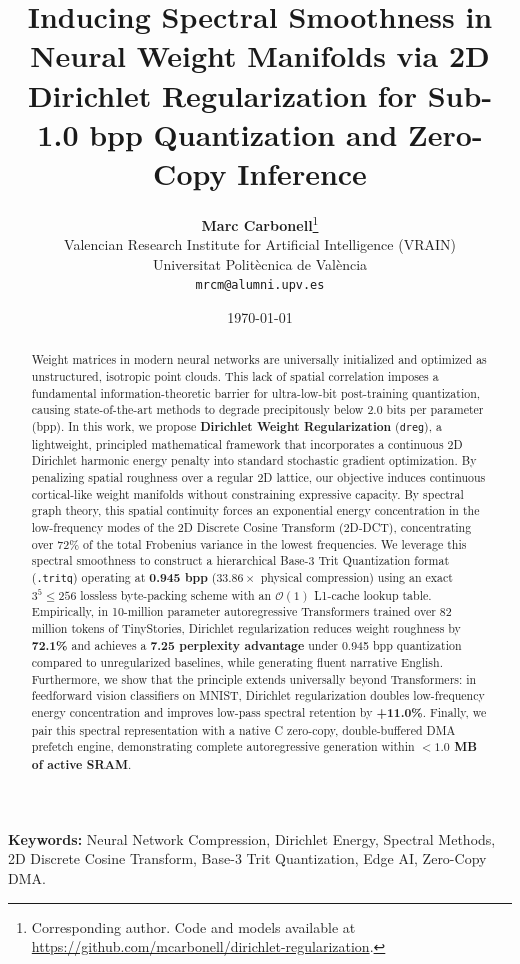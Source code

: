 \documentclass[11pt,a4paper]{article}
\title{\textbf{Inducing Spectral Smoothness in Neural Weight Manifolds via 2D Dirichlet Regularization for Sub-1.0 bpp Quantization and Zero-Copy Inference}}
\author{
  \textbf{Marc Carbonell}\thanks{Corresponding author. Code and models available at \url{https://github.com/mcarbonell/dirichlet-regularization}.} \\
  Valencian Research Institute for Artificial Intelligence (VRAIN) \\
  Universitat Politècnica de València \\
  \texttt{mrcm@alumni.upv.es}
}
\date{\today}
\begin{document}
\maketitle

\begin{abstract}
Weight matrices in modern neural networks are universally initialized and optimized as unstructured, isotropic point clouds. This lack of spatial correlation imposes a fundamental information-theoretic barrier for ultra-low-bit post-training quantization, causing state-of-the-art methods to degrade precipitously below 2.0 bits per parameter (bpp). In this work, we propose \textbf{Dirichlet Weight Regularization} (\texttt{dreg}), a lightweight, principled mathematical framework that incorporates a continuous 2D Dirichlet harmonic energy penalty into standard stochastic gradient optimization. 
By penalizing spatial roughness over a regular 2D lattice, our objective induces continuous cortical-like weight manifolds without constraining expressive capacity. 
By spectral graph theory, this spatial continuity forces an exponential energy concentration in the low-frequency modes of the 2D Discrete Cosine Transform (2D-DCT), concentrating over $72\%$ of the total Frobenius variance in the lowest frequencies.
We leverage this spectral smoothness to construct a hierarchical Base-3 Trit Quantization format (\texttt{.tritq}) operating at \textbf{0.945 bpp} ($33.86\times$ physical compression) using an exact $3^5 \le 256$ lossless byte-packing scheme with an $\mathcal{O}(1)$ L1-cache lookup table. 
Empirically, in 10-million parameter autoregressive Transformers trained over 82 million tokens of TinyStories, Dirichlet regularization reduces weight roughness by \textbf{72.1\%} and achieves a \textbf{7.25 perplexity advantage} under 0.945 bpp quantization compared to unregularized baselines, while generating fluent narrative English. 
Furthermore, we show that the principle extends universally beyond Transformers: in feedforward vision classifiers on MNIST, Dirichlet regularization doubles low-frequency energy concentration and improves low-pass spectral retention by \textbf{+11.0\%}. 
Finally, we pair this spectral representation with a native C zero-copy, double-buffered DMA prefetch engine, demonstrating complete autoregressive generation within \textbf{$<1.0$ MB of active SRAM}.
\end{abstract}

\vspace{0.5em}
\noindent\textbf{Keywords:} Neural Network Compression, Dirichlet Energy, Spectral Methods, 2D Discrete Cosine Transform, Base-3 Trit Quantization, Edge AI, Zero-Copy DMA.
\end{document}
